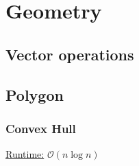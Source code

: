 \section{Geometry}
\subsection{Vector operations}


\subsection{Polygon}

\subsubsection{Convex Hull}
\underline{Runtime:} $\mathcal{O}(n \log n)$
